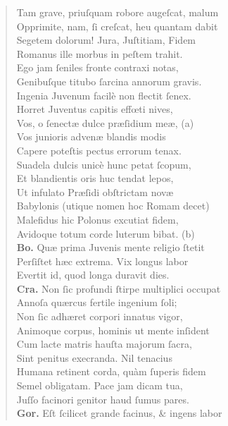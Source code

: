 \documentclass[a4paper,12pt]{article}
\begin{document}
\begin{verse}
Tam grave, priuſquam robore augeſcat, malum\\[0pt]
Opprimite, nam, ſi creſcat, heu quantam dabit\\[0pt]
Segetem dolorum! Jura, Juſtitiam, Fidem\\[0pt]
Romanus ille morbus in peſtem trahit.\\[0pt]
Ego jam ſeniles fronte contraxi notas,\\[0pt]
Genibuſque titubo ſarcina annorum gravis.\\[0pt]
Ingenia Juvenum facilè non flectit ſenex.\\[0pt]
Horret Juventus capitis effœti nives,\\[0pt]
Vos, o ſenectæ dulce præſidium meæ, (a)\footnotemark\\[0pt]
Vos junioris advenæ blandis modis\\[0pt]
Capere poteſtis pectus errorum tenax.\\[0pt]
Suadela dulcis unicè hunc petat ſcopum,\\[0pt]
Et blandientis oris huc tendat lepos,\\[0pt]
Ut infulato Præſidi obſtrictam novæ\\[0pt]
Babylonis (utique nomen hoc Romam decet)\\[0pt]
Malefidus hic Polonus excutiat fidem,\\[0pt]
Avidoque totum corde luterum bibat. (b)\footnotemark\\[0pt]
\textbf{Bo.} Quæ prima Juvenis mente religio ſtetit\\[0pt]
Perſiſtet hæc extrema. Vix longus labor\\[0pt]
Evertit id, quod longa duravit dies.\\[0pt]
\textbf{Cra.} Non ſic profundi ſtirpe multiplici occupat\\[0pt]
Annoſa quærcus fertile ingenium ſoli;\\[0pt]
Non ſic adhæret corpori innatus vigor,\\[0pt]
Animoque corpus, hominis ut mente inſident\\[0pt]
Cum lacte matris hauſta majorum ſacra,\\[0pt]
Sint penitus execranda. Nil tenacius\\[0pt]
Humana retinent corda, quàm ſuperis fidem\\[0pt]
Semel obligatam. Pace jam dicam tua,\\[0pt]
Juſſo facinori genitor haud ſumus pares.\\[0pt]
\textbf{Gor.} Eſt ſcilicet grande facinus, \& ingens labor\\[0pt]

\end{verse}
\end{document}
